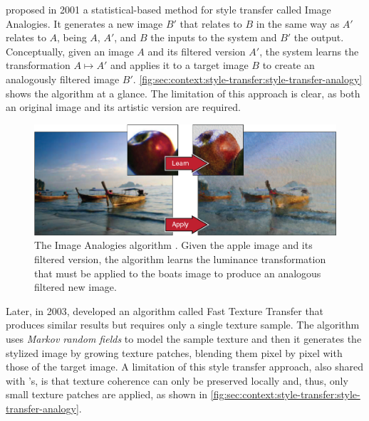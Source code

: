 \citet{Hertzmann2001} proposed in 2001 a statistical-based method for style transfer called Image Analogies.
It generates a new image $B'$ that relates to $B$ in the same way as $A'$ relates to $A$, being $A$, $A'$, and $B$ the inputs to the system and $B'$ the output.
Conceptually, given an image $A$ and its filtered version $A'$, the system learns the transformation $A \mapsto A'$ and applies it to a target image $B$ to create an analogously filtered image $B'$.
\autoref{fig:sec:context:style-transfer:style-transfer-analogy} shows the algorithm at a glance.
The limitation of this approach is clear, as both an original image and its artistic version are required.

\begin{figure}[t]
  \includegraphics[width=\textwidth]{gfx/style-transfer-analogy}
  \caption{
    The Image Analogies algorithm \cite{Hertzmann2001}.
    Given the apple image and its filtered version, the algorithm learns the luminance transformation that must be applied to the boats image to produce an analogous filtered new image.
  }
  \label{fig:sec:context:style-transfer:style-transfer-analogy}
\end{figure}

Later, in 2003, \citet{Ashikhmin2003} developed an algorithm called Fast Texture Transfer that produces similar results but requires only a single texture sample.
The algorithm uses \emph{Markov random fields} to model the sample texture and then it generates the stylized image by growing texture patches, blending them pixel by pixel with those of the target image.
A limitation of this style transfer approach, also shared with \citeauthor{Hertzmann2001}'s, is that texture coherence can only be preserved locally \cite{Lee2010} and, thus, only small texture patches are applied, as shown in \autoref{fig:sec:context:style-transfer:style-transfer-analogy}.

